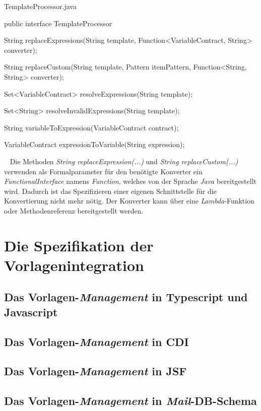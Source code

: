 \begin{program}[h]
\caption{TemplateProcessor.java}
\label{prog:templateProcessor}
\begin{JavaCode}
public interface TemplateProcessor {

    String replaceExpressions(String template,
                              Function<VariableContract, String> converter);

    String replaceCustom(String template,
                         Pattern itemPattern,
                         Function<String, String> converter);

    Set<VariableContract> resolveExpressions(String template);

    Set<String> resolveInvalidExpressions(String template);

    String variableToExpression(VariableContract contract);

    VariableContract expressionToVariable(String expression);
}
\end{JavaCode}
\end{program}
\ \newline 
Die Methoden \emph{String replaceExpression(...)} und \emph{String replaceCustom(...)} verwenden als Formalparameter für den benötigte Konverter ein \emph{FunctionalInterface} namens \emph{Function}, welches von der Sprache \emph{Java} bereitgestellt wird. Dadurch ist das Spezifizieren einer eigenen Schnittstelle für die Konvertierung nicht mehr nötig. Der Konverter kann über eine \emph{Lambda}-Funktion oder Methodenreferenz bereitgestellt werden. 

\section{Die Spezifikation der Vorlagenintegration}
\subsection{Das Vorlagen-\emph{Management} in Typescript und Javascript}

\subsection{Das Vorlagen-\emph{Management} in CDI}

\subsection{Das Vorlagen-\emph{Management} in JSF}

\subsection{Das Vorlagen-\emph{Management} in \emph{Mail}-DB-Schema}

